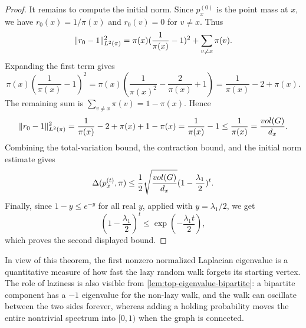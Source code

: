 \begin{proof}
	It remains to compute the initial norm. Since \(p_x^{(0)}\) is the point mass at \(x\), we have \(r_0(x)=1/\pi(x)\) and \(r_0(v)=0\) for \(v\neq x\). Thus
	\begin{equation}
		\lVert r_0-1\rVert_{L^2(\pi)}^2
		=
		\pi(x)(\frac{1}{\pi(x)}-1)^2+\sum_{v\neq x}\pi(v).
	\end{equation}
	Expanding the first term gives
	\begin{equation}
		\pi(x)\left(\frac{1}{\pi(x)}-1\right)^2
		=
		\pi(x)\left(\frac{1}{\pi(x)^2}-\frac{2}{\pi(x)}+1\right)
		=
		\frac{1}{\pi(x)}-2+\pi(x).
	\end{equation}
	The remaining sum is \(\sum_{v\neq x}\pi(v)=1-\pi(x)\). Hence
	\begin{equation}
		\lVert r_0-1\rVert_{L^2(\pi)}^2
		=
		\frac{1}{\pi(x)}-2+\pi(x)+1-\pi(x)
		=
		\frac{1}{\pi(x)}-1
		\leq
		\frac{1}{\pi(x)}
		=
		\frac{vol(G)}{d_x}.
	\end{equation}
	Combining the total-variation bound, the contraction bound, and the initial norm estimate gives
	\begin{equation}
		\Delta(p_x^{(t)},\pi)
		\leq
		\frac{1}{2}\sqrt{\frac{vol(G)}{d_x}}(1-\frac{\lambda_1}{2})^t.
	\end{equation}
	Finally, since \(1-y\leq e^{-y}\) for all real \(y\), applied with \(y=\lambda_1/2\), we get
	\begin{equation}
		\left(1-\frac{\lambda_1}{2}\right)^t\leq \exp\left(-\frac{\lambda_1 t}{2}\right),
	\end{equation}
	which proves the second displayed bound.
\end{proof}

In view of this theorem, the first nonzero normalized Laplacian eigenvalue is a quantitative measure of how fast the lazy random walk forgets its starting vertex. The role of laziness is also visible from \cref{lem:top-eigenvalue-bipartite}: a bipartite component has a \(-1\) eigenvalue for the non-lazy walk, and the walk can oscillate between the two sides forever, whereas adding a holding probability moves the entire nontrivial spectrum into \([0,1)\) when the graph is connected.
